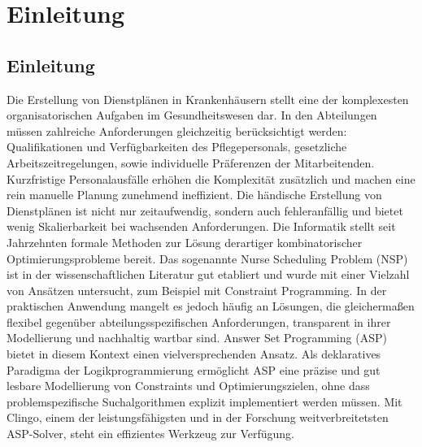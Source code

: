 \cleardoubleoddpage%
\chapter{Einleitung}
\label{sec:introduction}


\section{Einleitung}
\label{sec:introduction:motivation}

Die Erstellung von Dienstplänen in Krankenhäusern stellt eine der komplexesten organisatorischen Aufgaben im Gesundheitswesen dar. In den Abteilungen müssen zahlreiche Anforderungen gleichzeitig berücksichtigt werden: Qualifikationen und Verfügbarkeiten des Pflegepersonals, gesetzliche Arbeitszeitregelungen, sowie individuelle Präferenzen der Mitarbeitenden. Kurzfristige Personalausfälle erhöhen die Komplexität zusätzlich und machen eine rein manuelle Planung zunehmend ineffizient. Die händische Erstellung von Dienstplänen ist nicht nur zeitaufwendig, sondern auch fehleranfällig und bietet wenig Skalierbarkeit bei wachsenden Anforderungen.
Die Informatik stellt seit Jahrzehnten formale Methoden zur Lösung derartiger kombinatorischer Optimierungsprobleme bereit. Das sogenannte Nurse Scheduling Problem (NSP) ist in der wissenschaftlichen Literatur gut etabliert und wurde mit einer Vielzahl von Ansätzen untersucht, zum Beispiel mit Constraint Programming. In der praktischen Anwendung mangelt es jedoch häufig an Lösungen, die gleichermaßen flexibel gegenüber abteilungsspezifischen Anforderungen, transparent in ihrer Modellierung und nachhaltig wartbar sind.
Answer Set Programming (ASP) bietet in diesem Kontext einen vielversprechenden Ansatz. Als deklaratives Paradigma der Logikprogrammierung ermöglicht ASP eine präzise und gut lesbare Modellierung von Constraints und Optimierungszielen, ohne dass problemspezifische Suchalgorithmen explizit implementiert werden müssen. Mit Clingo, einem der leistungsfähigsten und in der Forschung weitverbreitetsten ASP-Solver, steht ein effizientes Werkzeug zur Verfügung.



